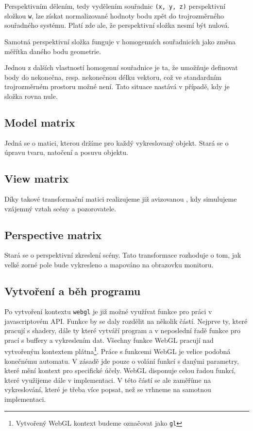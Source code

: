 Perspektivním dělením, tedy vydělením souřadnic \texttt{(x, y, z)} perspektivní složkou \texttt{w}, lze získat normalizované hodnoty bodu zpět do trojrozměrného souřadného systému. Platí zde ale, že perspektivní složka nesmí být nulová. 

Samotná perspektivní složka funguje v homogenních souřadnicích jako změna měřítka daného bodu geometrie.

Jednou z dalších vlastností homogenní souřadnice je ta, že umožňuje definovat body do nekonečna, resp. nekonečnou délku vektoru, což ve standardním trojrozměrném prostoru možné není. Tato situace nastává v případě, kdy je složka rovna nule.

\subsection{Model matrix}
Jedná se o matici, kterou držíme pro každý vykreslovaný objekt. Stará se o úpravu tvaru, natočení a posuvu objektu.

\subsection{View matrix}
Díky takové transformační matici realizujeme již avizovanou , kdy simulujeme vzájemný vztah scény a pozorovatele.

\subsection{Perspective matrix}
Stará se o perspektivní zkreslení scény. Tato transformace rozhoduje o tom, jak velké zorné pole bude vykresleno a mapováno 
na obrazovku monitoru. \cite{zdrojak}

\newpage

\subsection{Vytvoření a běh programu}
Po vytvoření kontextu \texttt{webgl} je již možné využívat funkce pro práci v javascriptovém API. Funkce by se daly rozdělit na několik částí. Nejprve ty, které pracují s shadery, dále ty které vytváří program a v neposlední řadě funkce pro prací s buffery a vykreslením dat. Všechny funkce WebGL pracují nad vytvořeným kontextem plátna\footnote{Vytvořený WebGL kontext budeme označovat jako \texttt{gl}}. Práce s funkcemi WebGL je velice podobná konečnému automatu. V zásadě jde pouze o volání funkcí s danými parametry, které mění kontext pro specifické účely. WebGL disponuje celou řadou funkcí, které využijeme dále v implementaci. V této částí se ale zaměříme na vykreslování, které je třeba více popsat, než se vrhneme na samotnou implementaci. 

